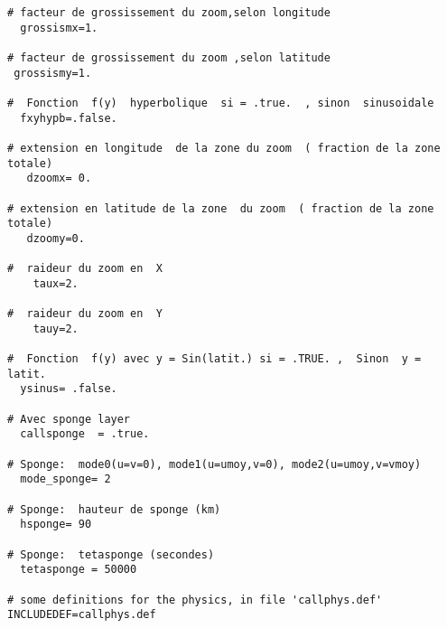 {\begin{verbatim}
# facteur de grossissement du zoom,selon longitude
  grossismx=1.

# facteur de grossissement du zoom ,selon latitude
 grossismy=1.

#  Fonction  f(y)  hyperbolique  si = .true.  , sinon  sinusoidale
  fxyhypb=.false.

# extension en longitude  de la zone du zoom  ( fraction de la zone totale)
   dzoomx= 0.

# extension en latitude de la zone  du zoom  ( fraction de la zone totale)
   dzoomy=0.

#  raideur du zoom en  X
    taux=2.

#  raideur du zoom en  Y
    tauy=2.

#  Fonction  f(y) avec y = Sin(latit.) si = .TRUE. ,  Sinon  y = latit.
  ysinus= .false.

# Avec sponge layer
  callsponge  = .true.

# Sponge:  mode0(u=v=0), mode1(u=umoy,v=0), mode2(u=umoy,v=vmoy)
  mode_sponge= 2

# Sponge:  hauteur de sponge (km)
  hsponge= 90

# Sponge:  tetasponge (secondes)
  tetasponge = 50000

# some definitions for the physics, in file 'callphys.def'
INCLUDEDEF=callphys.def


\end{verbatim}
}
